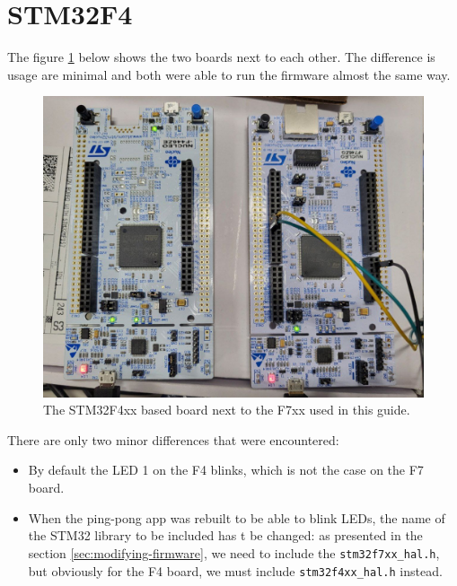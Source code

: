 \documentclass[10pt]{article}
\begin{document}
\pagebreak

\section{STM32F4}
\label{appendix:stm32f4}
The figure \ref{fig:f4} below shows the two boards next to each other. The difference is usage are minimal and both were able to run the firmware almost the same way.

\begin{figure}[H]
  \centering
  \includegraphics[width=.8\textwidth]{./img/f4.jpg}
  \caption{The STM32F4xx based board next to the F7xx used in this guide.}
  \label{fig:f4}
\end{figure}

There are only two minor differences that were encountered:
\begin{itemize}
\item By default the LED 1 on the F4 blinks, which is not the case on the F7 board.
\item When the ping-pong app was rebuilt to be able to blink LEDs, the name of the STM32 library to be included has t be changed: as presented in the section \ref{sec:modifying-firmware}, we need to include the \verb|stm32f7xx_hal.h|, but obviously for the F4 board, we must include \verb|stm32f4xx_hal.h| instead.
\end{itemize}
\end{document}
